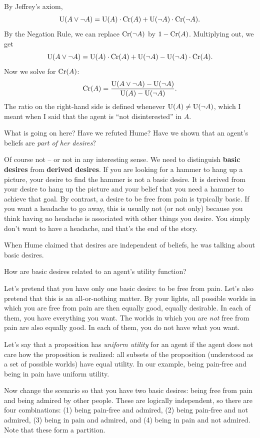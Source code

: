 By Jeffrey's axiom,
\[
  \text{U}(A \lor \neg A) = \text{U}(A)\cdot \text{Cr}(A) + \text{U}(\neg A)\cdot \text{Cr}(\neg A).
\]
By the Negation Rule, we can replace $\text{Cr}(\neg A)$ by $1 - \text{Cr}(A)$.
Multiplying out, we get
\[
  \text{U}(A \lor \neg A) = \text{U}(A)\cdot \text{Cr}(A) + \text{U}(\neg A) - \text{U}(\neg A)\cdot \text{Cr}(A).
\]
Now we solve for $\text{Cr}(A)$:
\[
  \text{Cr}(A) = \frac{\text{U}(A \lor \neg A) - \text{U}(\neg A)}{\text{U}(A) - \text{U}(\neg A)}.
\]
The ratio on the right-hand side is defined whenever $\text{U}(A) \not= \text{U}(\neg A)$, which I meant when I said that the agent is ``not disinterested'' in $A$.

What is going on here? Have we refuted Hume? Have we shown that an
agent's beliefs are \emph{part of her desires}? 

Of course not -- or not in any interesting sense. We need to distinguish
\textbf{basic desires} from \textbf{derived desires}. If you are looking for a
hammer to hang up a picture, your desire to find the hammer is not a basic
desire. It is derived from your desire to hang up the picture and your
belief that you need a hammer to achieve that goal. By contrast, a desire to be
free from pain is typically basic. If you want a headache to go away, this is
usually not (or not only) because you think having no headache is associated
with other things you desire. You simply don't want to have a headache, and
that's the end of the story.

When Hume claimed that desires are independent of beliefs, he was
talking about basic desires.

How are basic desires related to an agent's utility function?

Let's pretend that you have only one basic desire: to be free from pain. Let's
also pretend that this is an all-or-nothing matter. By your lights, all possible
worlds in which you are free from pain are then equally good, equally desirable.
In each of them, you have everything you want. The worlds in which you are
\emph{not} free from pain are also equally good. In each of them, you do not
have what you want.

Let's say that a proposition has \emph{uniform utility} for an agent if the
agent does not care how the proposition is realized: all subsets of the
proposition (understood as a set of possible worlds) have equal utility. In our
example, being pain-free and being in pain have uniform utility.

Now change the scenario so that you have two basic desires: being free from
pain and being admired by other people. These are logically independent, so
there are four combinations: (1) being pain-free and admired, (2) being
pain-free and not admired, (3) being in pain and admired, and (4) being in pain
and not admired. Note that these form a partition.


